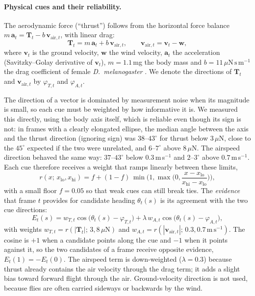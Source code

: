 \paragraph{Physical cues and their reliability.}
The aerodynamic force (``thrust'') follows from the horizontal force balance $m\,\mathbf{a}_t = \mathbf{T}_t -
b\,\mathbf{v}_{\mathrm{air},t}$, with linear drag:
\begin{equation}
  \mathbf{T}_t = m\,\mathbf{a}_t + b\,\mathbf{v}_{\mathrm{air},t}, \qquad
  \mathbf{v}_{\mathrm{air},t} = \mathbf{v}_t - \mathbf{w},
\end{equation}
where $\mathbf{v}_t$ is the ground velocity, $\mathbf{w}$ the wind velocity, $\mathbf{a}_t$ the acceleration
(Savitzky--Golay derivative of $\mathbf{v}_t$), $m = 1.1$\,mg the body mass and $b = 11\,\mu\mathrm{N\,s\,m^{-1}}$
the drag coefficient of female \emph{D.~melanogaster} \citep{fuller2014}. We denote the directions of
$\mathbf{T}_t$ and $\mathbf{v}_{\mathrm{air},t}$ by $\varphi_{T,t}$ and $\varphi_{A,t}$.

The direction of a vector is dominated by measurement noise when its magnitude is small, so each cue must be
weighted by how informative it is. We measured this directly, using the body axis itself, which is reliable even
though its sign is not: in frames with a clearly elongated ellipse, the median angle between the axis and the
thrust direction (ignoring sign) was $38$--$43^\circ$ for thrust below $3\,\mu$N, close to the $45^\circ$ expected
if the two were unrelated, and $6$--$7^\circ$ above $8\,\mu$N. The airspeed direction behaved the same way:
$37$--$43^\circ$ below $0.3$\,m\,s$^{-1}$ and $2$--$3^\circ$ above $0.7$\,m\,s$^{-1}$. Each cue therefore receives a
weight that ramps linearly between these limits,
\begin{equation}
  r(x;\, x_{\mathrm{lo}}, x_{\mathrm{hi}}) = f + (1 - f)\,
  \min\!\Big(1, \max\!\Big(0, \frac{x - x_{\mathrm{lo}}}{x_{\mathrm{hi}} - x_{\mathrm{lo}}}\Big)\Big),
\end{equation}
with a small floor $f = 0.05$ so that weak cues can still break ties. The \emph{evidence} that frame $t$ provides for
candidate heading $\theta_t(s)$ is its agreement with the two cue directions:
\begin{equation}
  E_t(s) = w_{T,t}\cos\!\big(\theta_t(s) - \varphi_{T,t}\big)
         + \lambda\, w_{A,t}\cos\!\big(\theta_t(s) - \varphi_{A,t}\big),
\end{equation}
with weights $w_{T,t} = r(|\mathbf{T}_t|;\, 3, 8\,\mu\mathrm{N})$ and
$w_{A,t} = r(|\mathbf{v}_{\mathrm{air},t}|;\, 0.3, 0.7\,\mathrm{m\,s^{-1}})$. The cosine is $+1$ when a candidate points along the cue and $-1$ when it points against it, so the two candidates
of a frame receive opposite evidence, $E_t(1) = -E_t(0)$. The airspeed term is down-weighted ($\lambda = 0.3$)
because thrust already contains the air velocity through the drag term; it adds a slight bias toward forward
flight through the air. Ground-velocity direction is not used, because flies are often carried sideways or
backwards by the wind.

